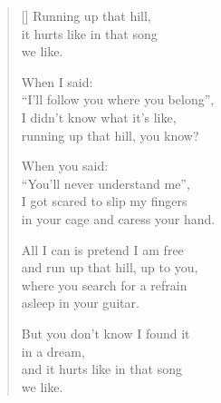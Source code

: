 \documentclass[12pt,a4paper]{article}
\begin{document}
\thispagestyle{empty}


\settowidth{\versewidth}{But it's all cages and enclosures}

\bigskip

\begin{verse}[\versewidth]
  Running up that hill, \\
  it hurts like in that song \\
  we like.

  When I said: \\
  ``I'll follow you where you belong'', \\
  I didn't know what it's like, \\
  running up that hill, you know?

  When you said: \\
  ``You'll never understand me'', \\
  I got scared to slip my fingers \\
  in your cage and caress your hand.

  All I can is pretend I am free \\
  and run up that hill, up to you, \\
  where you search for a refrain \\
  asleep in your guitar.

  But you don't know I found it \\
  in a dream, \\
  and it hurts like in that song \\
  we like.
\end{verse}
\end{document}
